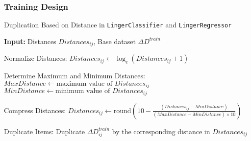 \documentclass[a4paper, 12pt]{report}
\begin{document}
\subsubsection{Training Design}
\begin{algorithm}[H]
    \caption{Duplication Based on Distance in \texttt{LingerClassifier} and \texttt{LingerRegressor}}
    \label{alg:duplication_design_based_on_distance_train}
    \textbf{Input:} Distances $Distances_{ij}$, Base dataset $\Delta D^{train}$
    \begin{algorithmic}[1]
        \State Normalize Distances:
            \State $Distances_{ij} \gets \log_e(Distances_{ij} + 1)$ 
        \EndFor

        \State Determine Maximum and Minimum Distances:
        \State $MaxDistance \gets \text{maximum value of } Distances_{ij}$
        \State $MinDistance \gets \text{minimum value of } Distances_{ij}$

        \State Compress Distances:
            \State $Distances_{ij} \gets \text{round}\left(10 - \frac{(Distances_{ij} - MinDistance)}{(MaxDistance - MinDistance) \times 10}\right)$
        \EndFor

        \State Duplicate Items:
            \State Duplicate $\Delta D^{train}_{ij}$ by the corresponding distance in $Distances_{ij}$
        \EndFor
    \end{algorithmic}
\end{algorithm}
\end{document}
